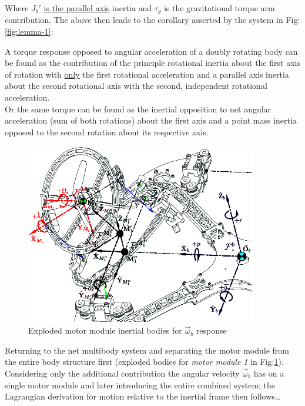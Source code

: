 Where $J_b'$ \underline{is the parallel axis} inertia and $\tau_g$ is the gravitational torque arm contribution. The above then leads to the corollary asserted by the system in Fig:\ref{fig:lemma-1}:
\begin{lemma}\label{lem:1}
A torque response opposed to angular acceleration of a doubly rotating body can be found as the contribution of the principle rotational inertia about the first axis of rotation with \underline{only} the first rotational acceleration and a parallel axis inertia about the second rotational axis with the second, independent rotational acceleration.
\\
Or the same torque can be found as the inertial opposition to net angular acceleration (sum of both rotations) about the first axis and a point mass inertia opposed to the second rotation about its respective axis.
\end{lemma}
\par
\begin{figure}[htbp]
\centering
\includegraphics[width=0.9\textwidth]{figs/response-body}
\vspace{-5pt}
\caption{Exploded motor module inertial bodies for $\vec{\omega}_b$ response}
\label{fig:response-body}
\vspace{-12pt}
\end{figure}
Returning to the net multibody system and separating the motor module from the entire body structure first (exploded bodies for \emph{motor module 1} in Fig:\ref{fig:response-body}). Considering only the additional contribution the angular velocity $\vec{\omega}_b$ has on a single motor module and later introducing the entire combined system; the Lagrangian derivation for motion relative to the inertial frame then follows\ldots
